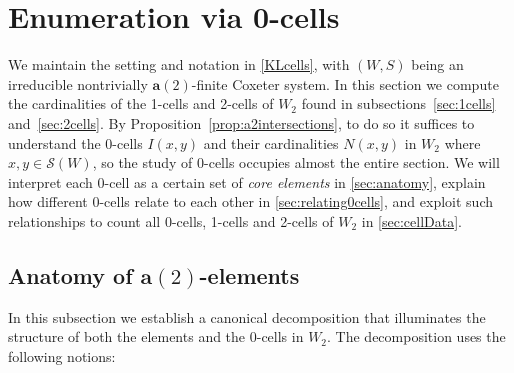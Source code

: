 \documentclass[ALCO,Unicode,published]{cedram}
\newcommand{\la}{\mathbf{a}}
\newcommand{\sw}{\mathcal{S}(W)}
\newcommand{\ntatf}{nontrivially $\la(2)$-finite }
\begin{document}
\section{Enumeration via 0-cells}
\label{sec:0cells}

We maintain the setting and notation in \autoref{KLcells}, with $(W,S)$ being an irreducible \ntatf
Coxeter system.  In this section we compute the cardinalities of the 1-cells and 2-cells of $W_2$
found in subsections~\ref{sec:1cells} and~\ref{sec:2cells}. By Proposition~\ref{prop:a2intersections}, to do so it
suffices to understand the 0-cells $I(x,y)$ and their cardinalities $N(x,y)$ in $W_2$ where $x,y\in
\sw$, so the study of 0-cells occupies almost the entire section. We will interpret each 0-cell as a
certain set of \emph{core elements} in \autoref{sec:anatomy}, explain how different 0-cells relate
to each other in \autoref{sec:relating0cells}, and exploit such relationships to count all 0-cells,
1-cells and 2-cells of $W_2$ in \autoref{sec:cellData}. 


\subsection{Anatomy of \texorpdfstring{$\la(2)$}{a(2)}-elements}
\label{sec:anatomy}
In this subsection we establish a canonical decomposition that illuminates the structure of both the
elements and the 0-cells in $W_2$. The decomposition uses the following notions: 
\end{document}
